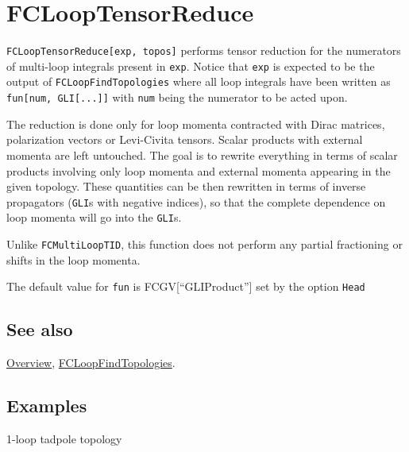 \documentclass[../FeynCalcManual.tex]{subfiles}
\begin{document}
\hypertarget{fclooptensorreduce}{
\section{FCLoopTensorReduce}\label{fclooptensorreduce}}

\texttt{FCLoopTensorReduce[\allowbreak{}exp,\ \allowbreak{}topos]}
performs tensor reduction for the numerators of multi-loop integrals
present in \texttt{exp}. Notice that \texttt{exp} is expected to be the
output of \texttt{FCLoopFindTopologies} where all loop integrals have
been written as
\texttt{fun[\allowbreak{}num,\ \allowbreak{}GLI[\allowbreak{}...]]} with
\texttt{num} being the numerator to be acted upon.

The reduction is done only for loop momenta contracted with Dirac
matrices, polarization vectors or Levi-Civita tensors. Scalar products
with external momenta are left untouched. The goal is to rewrite
everything in terms of scalar products involving only loop momenta and
external momenta appearing in the given topology. These quantities can
be then rewritten in terms of inverse propagators (\texttt{GLI}s with
negative indices), so that the complete dependence on loop momenta will
go into the \texttt{GLI}s.

Unlike \texttt{FCMultiLoopTID}, this function does not perform any
partial fractioning or shifts in the loop momenta.

The default value for \texttt{fun} is FCGV{[}``GLIProduct''{]} set by
the option \texttt{Head}

\subsection{See also}

\hyperlink{toc}{Overview},
\hyperlink{fcloopfindtopologies}{FCLoopFindTopologies}.

\subsection{Examples}

1-loop tadpole topology

\begin{Shaded}
\begin{Highlighting}[]
\ExtensionTok{=}\OperatorTok{[}\OperatorTok{,} \OperatorTok{\{}\OperatorTok{[\{}\OperatorTok{,} \SpecialCharTok{\^{}}\OperatorTok{\}]\},} \OperatorTok{\{}\OperatorTok{\},} \OperatorTok{\{\},} \OperatorTok{\{\},} \OperatorTok{\{\}]}
\end{Highlighting}
\end{Shaded}
\end{document}
